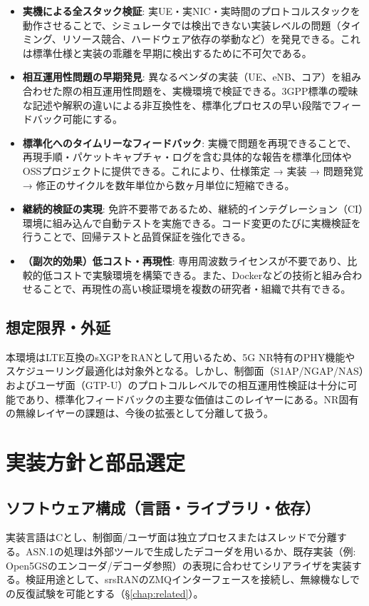 \begin{itemize}
	\item \textbf{実機による全スタック検証}: 実UE・実NIC・実時間のプロトコルスタックを動作させることで、シミュレータでは検出できない実装レベルの問題（タイミング、リソース競合、ハードウェア依存の挙動など）を発見できる。これは標準仕様と実装の乖離を早期に検出するために不可欠である。

	\item \textbf{相互運用性問題の早期発見}: 異なるベンダの実装（UE、eNB、コア）を組み合わせた際の相互運用性問題を、実機環境で検証できる。3GPP標準の曖昧な記述や解釈の違いによる非互換性を、標準化プロセスの早い段階でフィードバック可能にする。

	\item \textbf{標準化へのタイムリーなフィードバック}: 実機で問題を再現できることで、再現手順・パケットキャプチャ・ログを含む具体的な報告を標準化団体やOSSプロジェクトに提供できる。これにより、仕様策定 → 実装 → 問題発覚 → 修正のサイクルを数年単位から数ヶ月単位に短縮できる。

	\item \textbf{継続的検証の実現}: 免許不要帯であるため、継続的インテグレーション（CI）環境に組み込んで自動テストを実施できる。コード変更のたびに実機検証を行うことで、回帰テストと品質保証を強化できる。

	\item \textbf{（副次的効果）低コスト・再現性}: 専用周波数ライセンスが不要であり、比較的低コストで実験環境を構築できる。また、Dockerなどの技術と組み合わせることで、再現性の高い検証環境を複数の研究者・組織で共有できる。
\end{itemize}

\subsection{想定限界・外延}
本環境はLTE互換のsXGPをRANとして用いるため、5G NR特有のPHY機能やスケジューリング最適化は対象外となる。しかし、制御面（S1AP/NGAP/NAS）およびユーザ面（GTP-U）のプロトコルレベルでの相互運用性検証は十分に可能であり、標準化フィードバックの主要な価値はこのレイヤーにある。NR固有の無線レイヤーの課題は、今後の拡張として分離して扱う。

\section{実装方針と部品選定}
\subsection{ソフトウェア構成（言語・ライブラリ・依存）}
実装言語はCとし、制御面/ユーザ面は独立プロセスまたはスレッドで分離する。ASN.1の処理は外部ツールで生成したデコーダを用いるか、既存実装（例: Open5GSのエンコーダ/デコーダ参照\cite{open5gs}）の表現に合わせてシリアライザを実装する。検証用途として、srsRANのZMQインターフェースを接続し、無線機なしでの反復試験を可能とする（\S\ref{chap:related}）。

